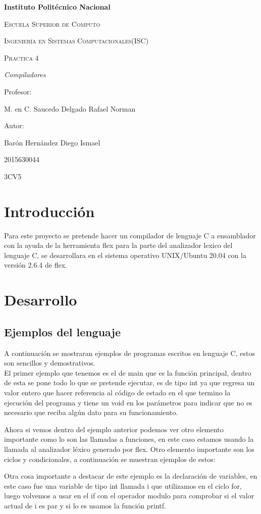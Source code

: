\documentclass{article}
\begin{document}
	\begin{titlepage}
		\centering
		{\bfseries\LARGE Instituto Politécnico Nacional \par}
		\vspace{1cm}
		{\scshape\Large Escuela Superior de Computo \par}
		\vspace{1cm}
		{\scshape\Large Ingeniería en Sistemas Computacionales(ISC) \par}
		\vspace{3cm}
		{\scshape\Huge Practica 4 \par}
		\vspace{3cm}
		{\itshape\Large Compiladores \par}
		\vfill
		{\Large Profesor: \par}
		{\Large M. en C. Saucedo Delgado Rafael Norman \par}
		\vspace{1cm}
		{\Large Autor: \par}
		{\Large Barón Hernández Diego Ismael \par}
		{\Large 2015630044 \par}
		\vfill
		{\Large 3CV5 \par}
	\end{titlepage}
	\newpage
	\tableofcontents
	\newpage
	\section{Introducción}
		Para este proyecto se pretende hacer un compilador de lenguaje C a ensamblador con la ayuda de la herramienta flex para la parte del analizador lexico del lenguaje C, se desarrollara en el sistema operativo UNIX/Ubuntu 20.04 con la versión 2.6.4 de flex.
	\section{Desarrollo}
		\subsection{Ejemplos del lenguaje}
			A continuación se mostraran ejemplos de programas escritos en lenguaje C, estos son sencillos y demostrativos.\\
			El primer ejemplo que tenemos es el de main que es la función principal, dentro de esta se pone todo lo que se pretende ejecutar, es de tipo int ya que regresa un valor entero que hacer referencia al código de estado en el que termino la ejecución del programa y tiene un void en los parámetros para indicar que no es necesario que reciba algún dato para su funcionamiento.
			
			Ahora si vemos dentro del ejemplo anterior podemos ver otro elemento importante como lo son las llamadas a funciones, en este caso estamos usando la llamada al analizador léxico generado por flex.
			Otro elemento importante son los ciclos y condicionales, a continuación se muestran ejemplos de estos:
			
			Otra cosa importante a destacar de este ejemplo es la declaración de variables, en este caso fue una variable de tipo int llamada i que utilizamos en el ciclo for, luego volvemos a usar en el if con el operador modulo para comprobar si el valor actual de i es par y si lo es usamos la función printf.
		\newpage
\end{document}
